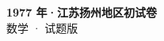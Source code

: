 \documentclass[zihao=-4, a4paper]{ctexart}
\begin{document}
\begin{center}
  {\Large\bfseries 1977 年·江苏扬州地区初试卷}\\[4pt]
  {\large 数学 · 试题版}
\end{center}
\medskip
{}

\end{document}
